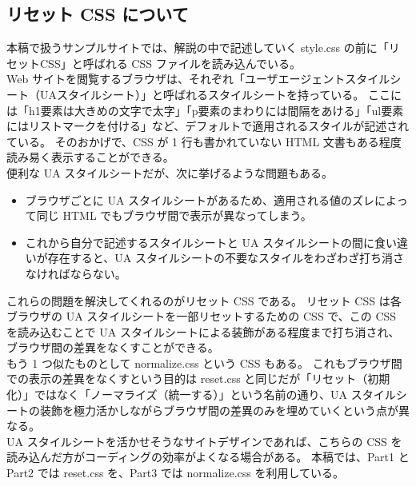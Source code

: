 \subsection{リセット CSS について}
本稿で扱うサンプルサイトでは、解説の中で記述していく style.css の前に「リセットCSS」と呼ばれる CSS ファイルを読み込んでいる。\\

Web サイトを閲覧するブラウザは、それぞれ「ユーザエージェントスタイルシート（UAスタイルシート）」と呼ばれるスタイルシートを持っている。
ここには「h1要素は大きめの文字で太字」「p要素のまわりには間隔をあける」「ul要素にはリストマークを付ける」など、デフォルトで適用されるスタイルが記述されている。
そのおかげで、CSS が 1 行も書かれていない HTML 文書もある程度読み易く表示することができる。\\

便利な UA スタイルシートだが、次に挙げるような問題もある。
\begin{itemize}\setlength{\leftskip}{-1.00zw}%
\item ブラウザごとに UA スタイルシートがあるため、適用される値のズレによって同じ HTML でもブラウザ間で表示が異なってしまう。
\item これから自分で記述するスタイルシートと UA スタイルシートの間に食い違いが存在すると、UA スタイルシートの不要なスタイルをわざわざ打ち消さなければならない。
\end{itemize}
これらの問題を解決してくれるのがリセット CSS である。
リセット CSS は各ブラウザの UA スタイルシートを一部リセットするための CSS で、この CSS を読み込むことで UA スタイルシートによる装飾がある程度まで打ち消され、ブラウザ間の差異をなくすことができる。\\

もう 1 つ似たものとして normalize.css という CSS もある。
これもブラウザ間での表示の差異をなくすという目的は reset.css と同じだが「リセット（初期化）」ではなく「ノーマライズ（統一する）」という名前の通り、UA スタイルシートの装飾を極力活かしながらブラウザ間の差異のみを埋めていくという点が異なる。\\

UA スタイルシートを活かせそうなサイトデザインであれば、こちらの CSS を読み込んだ方がコーディングの効率がよくなる場合がある。
本稿では、Part1 と Part2 では reset.css を、Part3 では normalize.css を利用している。
